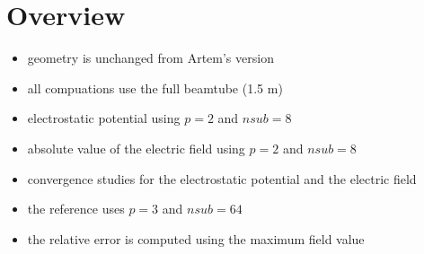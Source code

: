\section{Overview}
\begin{itemize}
  \item geometry is unchanged from Artem's version
  \item all compuations use the full beamtube (1.5 m)
\end{itemize}

\begin{center}
\begin{figure}[ht]
  
\end{figure}
\end{center}

\begin{itemize}
  \item electrostatic potential using $p=2$ and $nsub=8$
\end{itemize}

\begin{center}
\begin{figure}[ht]
  
\end{figure}
\end{center}

\begin{itemize}
  \item absolute value of the electric field using $p=2$ and $nsub=8$
\end{itemize}

\begin{center}
\begin{figure}[ht]
  
\end{figure}
\end{center}

\begin{itemize}
  \item convergence studies for the electrostatic potential and the electric field
  \item the reference uses $p=3$ and $nsub=64$
  \item the relative error is computed using the maximum field value
\end{itemize}

\begin{figure}[ht]
  \hspace{-2.5cm}
  
\end{figure}
